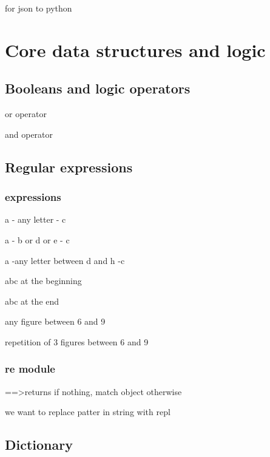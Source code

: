 			 for json to python



\section{Core data structures and logic}

	\subsection{Booleans and logic operators}

		\code{\|} or operator

		\code{\&} and operator



	\subsection{Regular expressions}

		\subsubsection{expressions}


			 a - any  letter  - c

			 a - b or d or e - c

			 a -any letter between d and h -c

			 abc at the beginning

			 abc at the end

			\code{[6-9]} any figure between 6 and 9

			 repetition of 3 figures between 6 and 9


			\subsubsection{re module}
			

				 ==>returns  if nothing, match object otherwise

				 we want to replace patter in string with repl



	\subsection{Dictionary}

